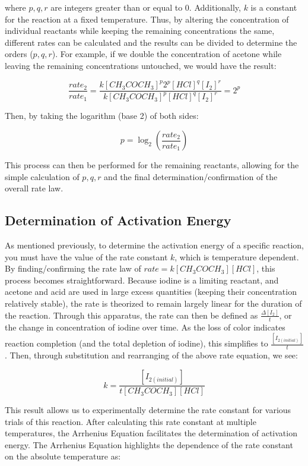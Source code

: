 where $p,q,r$ are integers greater than or equal to $0$. Additionally, $k$ is a constant for the reaction at a fixed temperature. Thus, by altering the concentration of individual reactants while keeping the remaining concentrations the same, different rates can be calculated and the results can be divided to determine the orders ($p,q,r$). For example, if we double the concentration of acetone while leaving the remaining concentrations untouched, we would have the result:

\[\frac{rate_2}{rate_1} = \frac{k[CH_3COCH_3]^p2^p[HCl]^q[I_2]^r}{k[CH_3COCH_3]^p[HCl]^q[I_2]^r} = 2^p\]

Then, by taking the logarithm (base 2) of both sides:

\[p = \log_2 \left(\frac{rate_2}{rate_1}\right)\]

This process can then be performed for the remaining reactants, allowing for the simple calculation of $p,q,r$ and the final determination/confirmation of the overall rate law.

\subsection{Determination of Activation Energy}
As mentioned previously, to determine the activation energy of a specific reaction, you must have the value of the rate constant $k$, which is temperature dependent. By finding/confirming the rate law of $rate = k[CH_3COCH_3][HCl]$, this process becomes straightforward. Because iodine is a limiting reactant, and acetone and acid are used in large excess quantities (keeping their concentration relatively stable), the rate is theorized to remain largely linear for the duration of the reaction. Through this apparatus, the rate can then be defined as $\frac{\Delta [I_2]}{t}$, or the change in concentration of iodine over time. As the loss of color indicates reaction completion (and the total depletion of iodine), this simplifies to $\frac{[I_{2(initial)}]}{t}$. Then, through substitution and rearranging of the above rate equation, we see:

\[k = \frac{[I_{2(initial)}]}{t[CH_3COCH_3][HCl]}\]

This result allows us to experimentally determine the rate constant for various trials of this reaction. After calculating this rate constant at multiple temperatures, the Arrhenius Equation facilitates the determination of activation energy. The Arrhenius Equation highlights the dependence of the rate constant on the absolute temperature as:

